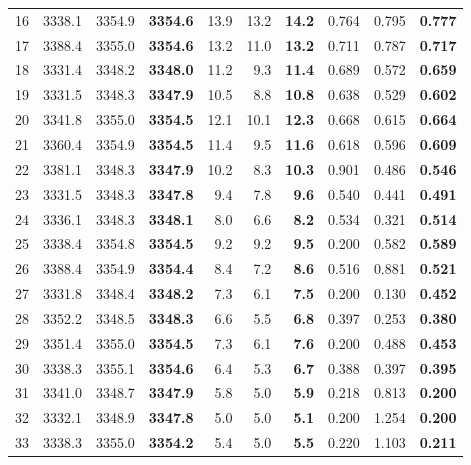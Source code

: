 \documentclass[a4paper,11pt]{article}
\begin{document}
\begin{longtable}{l rrr rrr rrr}
  16 & 3338.1 & 3354.9 & \textbf{3354.6} & 13.9 & 13.2 & \textbf{14.2} & 0.764 & 0.795 & \textbf{0.777} \\
  17 & 3388.4 & 3355.0 & \textbf{3354.6} & 13.2 & 11.0 & \textbf{13.2} & 0.711 & 0.787 & \textbf{0.717} \\
  18 & 3331.4 & 3348.2 & \textbf{3348.0} & 11.2 & 9.3 & \textbf{11.4} & 0.689 & 0.572 & \textbf{0.659} \\
  19 & 3331.5 & 3348.3 & \textbf{3347.9} & 10.5 & 8.8 & \textbf{10.8} & 0.638 & 0.529 & \textbf{0.602} \\
  20 & 3341.8 & 3355.0 & \textbf{3354.5} & 12.1 & 10.1 & \textbf{12.3} & 0.668 & 0.615 & \textbf{0.664} \\
  21 & 3360.4 & 3354.9 & \textbf{3354.5} & 11.4 & 9.5 & \textbf{11.6} & 0.618 & 0.596 & \textbf{0.609} \\
  22 & 3381.1 & 3348.3 & \textbf{3347.9} & 10.2 & 8.3 & \textbf{10.3} & 0.901 & 0.486 & \textbf{0.546} \\
  23 & 3331.5 & 3348.3 & \textbf{3347.8} & 9.4 & 7.8 & \textbf{9.6} & 0.540 & 0.441 & \textbf{0.491} \\
  24 & 3336.1 & 3348.3 & \textbf{3348.1} & 8.0 & 6.6 & \textbf{8.2} & 0.534 & 0.321 & \textbf{0.514} \\
  25 & 3338.4 & 3354.8 & \textbf{3354.5} & 9.2 & 9.2 & \textbf{9.5} & 0.200 & 0.582 & \textbf{0.589} \\
  26 & 3388.4 & 3354.9 & \textbf{3354.4} & 8.4 & 7.2 & \textbf{8.6} & 0.516 & 0.881 & \textbf{0.521} \\
  27 & 3331.8 & 3348.4 & \textbf{3348.2} & 7.3 & 6.1 & \textbf{7.5} & 0.200 & 0.130 & \textbf{0.452} \\
  28 & 3352.2 & 3348.5 & \textbf{3348.3} & 6.6 & 5.5 & \textbf{6.8} & 0.397 & 0.253 & \textbf{0.380} \\
  29 & 3351.4 & 3355.0 & \textbf{3354.5} & 7.3 & 6.1 & \textbf{7.6} & 0.200 & 0.488 & \textbf{0.453} \\
  30 & 3338.3 & 3355.1 & \textbf{3354.6} & 6.4 & 5.3 & \textbf{6.7} & 0.388 & 0.397 & \textbf{0.395} \\
  31 & 3341.0 & 3348.7 & \textbf{3347.9} & 5.8 & 5.0 & \textbf{5.9} & 0.218 & 0.813 & \textbf{0.200} \\
  32 & 3332.1 & 3348.9 & \textbf{3347.8} & 5.0 & 5.0 & \textbf{5.1} & 0.200 & 1.254 & \textbf{0.200} \\
  33 & 3338.3 & 3355.0 & \textbf{3354.2} & 5.4 & 5.0 & \textbf{5.5} & 0.220 & 1.103 & \textbf{0.211} \\

\end{longtable}
\end{document}
